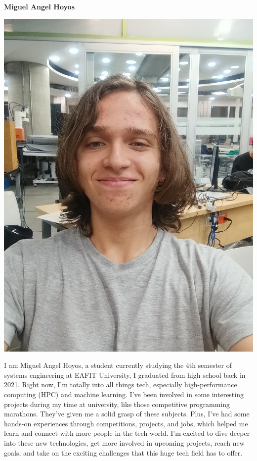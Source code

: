 \documentclass[11pt,a4paper,twocolumn]{article}
\begin{document}
\begin{center}
    \textbf{Miguel Angel Hoyos}
\end{center}
\begin{center}
    \includegraphics[width = .45\linewidth]{Images/Miguel Hoyos.jpeg}
\end{center}
I am Miguel Angel Hoyos, a student currently studying the 4th semester of systems engineering at EAFIT University, I graduated from high school back in 2021. Right now, I'm totally into all things tech, especially high-performance computing (HPC) and machine learning. I've been involved in some interesting projects during my time at university, like those competitive programming marathons. They've given me a solid grasp of these subjects. Plus, I've had some hands-on experiences through competitions, projects, and jobs, which helped me learn and connect with more people in the tech world. I'm excited to dive deeper into these new technologies, get more involved in upcoming projects, reach new goals, and take on the exciting challenges that this huge tech field has to offer.
\end{document}
